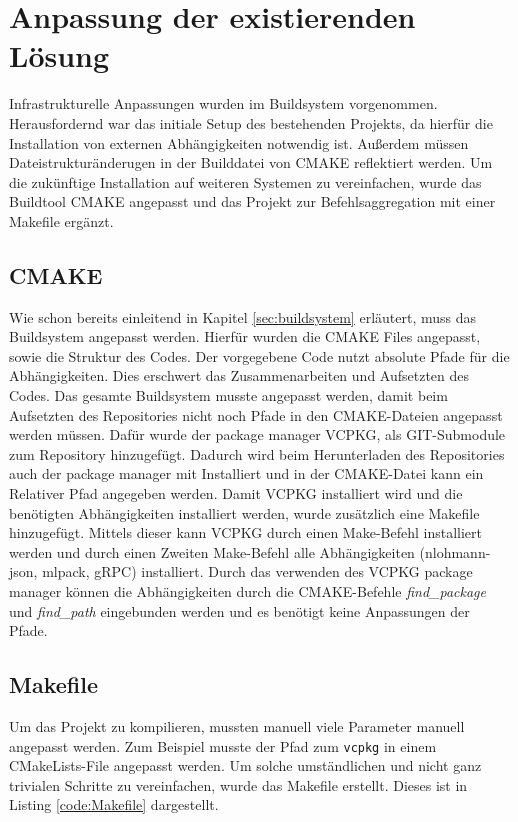 \section{Anpassung der existierenden Lösung}
Infrastrukturelle Anpassungen wurden im Buildsystem vorgenommen. Herausfordernd war das initiale Setup des bestehenden Projekts, da hierfür die Installation von externen Abhängigkeiten notwendig ist. Außerdem müssen Dateistrukturänderugen in der Builddatei von CMAKE reflektiert werden. Um die zukünftige Installation auf weiteren Systemen zu vereinfachen, wurde das Buildtool CMAKE angepasst und das Projekt zur Befehlsaggregation mit einer Makefile ergänzt.

\subsection{CMAKE}
\label{sec:cmake}
Wie schon bereits einleitend in Kapitel \ref{sec:buildsystem} erläutert, muss das Buildsystem angepasst werden. Hierfür wurden die CMAKE Files angepasst, sowie die Struktur des Codes. Der vorgegebene Code nutzt absolute Pfade für die Abhängigkeiten. Dies erschwert das Zusammenarbeiten und Aufsetzten des Codes. Das gesamte Buildsystem musste angepasst werden, damit beim Aufsetzten des Repositories nicht noch Pfade in den CMAKE-Dateien angepasst werden müssen. Dafür wurde der package manager VCPKG, als GIT-Submodule zum Repository hinzugefügt. Dadurch wird beim Herunterladen des Repositories auch der package manager mit Installiert und in der CMAKE-Datei kann ein Relativer Pfad angegeben werden. Damit VCPKG installiert wird und die benötigten Abhängigkeiten installiert werden, wurde zusätzlich eine Makefile hinzugefügt. Mittels dieser kann VCPKG durch einen Make-Befehl installiert werden und durch einen Zweiten Make-Befehl alle Abhängigkeiten (nlohmann-json, mlpack, gRPC) installiert. Durch das verwenden des VCPKG package manager können die Abhängigkeiten durch die CMAKE-Befehle \textit{find\_package} und \textit{find\_path} eingebunden werden und es benötigt keine Anpassungen der Pfade.

\subsection{Makefile}
Um das Projekt zu kompilieren, mussten manuell viele Parameter manuell angepasst werden. Zum Beispiel musste der Pfad zum \verb|vcpkg| in einem CMakeLists-File angepasst werden. Um solche umständlichen und nicht ganz trivialen Schritte zu vereinfachen, wurde das Makefile erstellt. Dieses ist in Listing \ref{code:Makefile} dargestellt.\\

